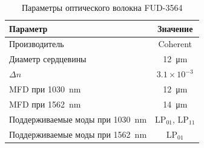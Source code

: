 \documentclass[14pt]{article}
\begin{document}
	
	\begin{table}[htbp]
		\centering
		\caption{Параметры оптического волокна FUD-3564}
		\label{tab:fud3564_params}
		\begin{tabular}{@{}lc@{}}
			\toprule
			Параметр & Значение \\
			\midrule
			Производитель & Coherent \\
			Диаметр сердцевины & \SI{12}{\micro\meter} \\
			$\Delta n$ & $3.1 \times 10^{-3}$ \\
			MFD при \SI{1030}{\nano\meter} & \SI{12}{\micro\meter} \\
			MFD при \SI{1562}{\nano\meter} & \SI{14}{\micro\meter} \\
			Поддерживаемые моды при \SI{1030}{\nano\meter} & LP$_{01}$, LP$_{11}$ \\
			Поддерживаемые моды при \SI{1562}{\nano\meter} & LP$_{01}$ \\
			\bottomrule
		\end{tabular}
	\end{table}
	
\end{document}
